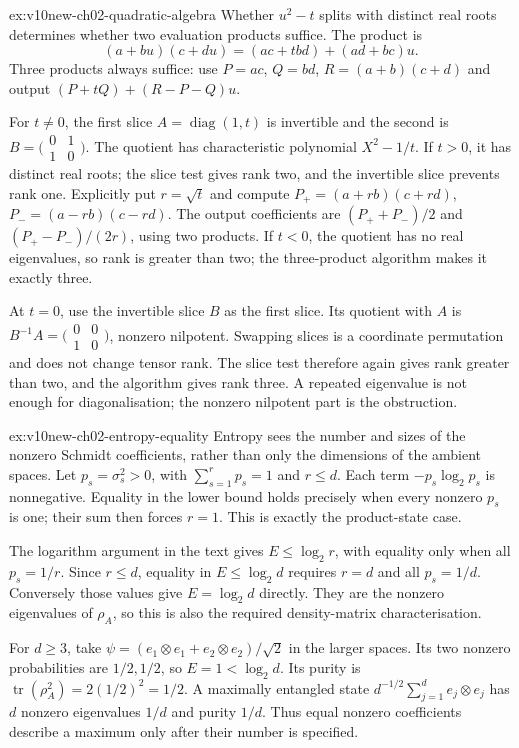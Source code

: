 \begin{solution}{ex:v10new-ch02-quadratic-algebra}
\idea Whether $u^2-t$ splits with distinct real roots determines whether two evaluation products suffice.
\writeup The product is
\[
(a+bu)(c+du)=(ac+tbd)+(ad+bc)u.
\]
Three products always suffice: use $P=ac$, $Q=bd$, $R=(a+b)(c+d)$ and output $(P+tQ)+(R-P-Q)u$.

For $t\ne0$, the first slice $A=\operatorname{diag}(1,t)$ is invertible and the second is $B=\bigl(\begin{smallmatrix}0&1\\1&0\end{smallmatrix}\bigr)$. The quotient has characteristic polynomial $X^2-1/t$. If $t>0$, it has distinct real roots; the slice test gives rank two, and the invertible slice prevents rank one. Explicitly put $r=\sqrt t$ and compute $P_+=(a+rb)(c+rd)$, $P_-=(a-rb)(c-rd)$. The output coefficients are $(P_++P_-)/2$ and $(P_+-P_-)/(2r)$, using two products. If $t<0$, the quotient has no real eigenvalues, so rank is greater than two; the three-product algorithm makes it exactly three.

At $t=0$, use the invertible slice $B$ as the first slice. Its quotient with $A$ is $B^{-1}A=\bigl(\begin{smallmatrix}0&0\\1&0\end{smallmatrix}\bigr)$, nonzero nilpotent. Swapping slices is a coordinate permutation and does not change tensor rank. The slice test therefore again gives rank greater than two, and the algorithm gives rank three. A repeated eigenvalue is not enough for diagonalisation; the nonzero nilpotent part is the obstruction.
\end{solution}

\begin{solution}{ex:v10new-ch02-entropy-equality}
\idea Entropy sees the number and sizes of the nonzero Schmidt coefficients, rather than only the dimensions of the ambient spaces.
\writeup Let $p_s=\sigma_s^2>0$, with $\sum_{s=1}^rp_s=1$ and $r\le d$. Each term $-p_s\log_2p_s$ is nonnegative. Equality in the lower bound holds precisely when every nonzero $p_s$ is one; their sum then forces $r=1$. This is exactly the product-state case.

The logarithm argument in the text gives $E\le\log_2r$, with equality only when all $p_s=1/r$. Since $r\le d$, equality in $E\le\log_2d$ requires $r=d$ and all $p_s=1/d$. Conversely those values give $E=\log_2d$ directly. They are the nonzero eigenvalues of $\rho_A$, so this is also the required density-matrix characterisation.

For $d\ge3$, take $\psi=(e_1\otimes e_1+e_2\otimes e_2)/\sqrt2$ in the larger spaces. Its two nonzero probabilities are $1/2,1/2$, so $E=1<\log_2d$. Its purity is $\operatorname{tr}(\rho_A^2)=2(1/2)^2=1/2$. A maximally entangled state $d^{-1/2}\sum_{j=1}^de_j\otimes e_j$ has $d$ nonzero eigenvalues $1/d$ and purity $1/d$. Thus equal nonzero coefficients describe a maximum only after their number is specified.
\end{solution}

